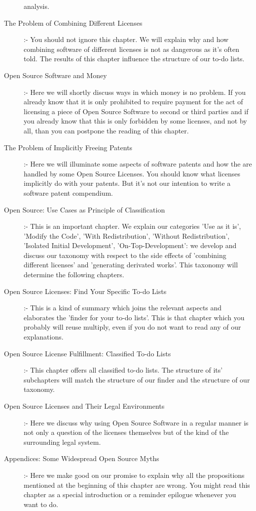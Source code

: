 \begin{description}
  analysis.
  \item[The Problem of Combining Different Licenses] :- You should
  not ignore this chapter. We will explain why and how combining software
  of different licenses is not as dangerous as it's often told. The results of
  this chapter influence the structure of our to-do lists.
  \item[Open Source Software and Money] :- Here we will shortly
  discuss ways in which money is no problem. If you already know that it is only
  prohibited to require payment for the act of licensing a piece of Open Source
  Software to second or third parties and if you already know that this is only
  forbidden by some licenses, and not by all, than you can postpone the reading
  of this chapter.
  \item[The Problem of Implicitly Freeing Patents] :- Here we
  will illuminate some aspects of software patents and how the are handled by
  some Open Source Licenses. You should know what licenses implicitly do with
  your patents. But it's not our intention to write a software patent
  compendium.
  \item[Open Source: Use Cases as Principle of Classification] :- This is an
  important chapter. We explain our categories 'Use as it is', 'Modify the
  Code', 'With Redistribution', 'Without Redistribution', 'Isolated Initial
  Development', 'On-Top-Development': we develop and discuss our taxonomy with
  respect to the side effects of 'combining different licenses' and 'generating
  derivated works'. This taxonomy will determine the following chapters.
  \item[Open Source Licenses: Find Your Specific To-do Lists] :- This is a kind
  of summary which joins the relevant aspects and elaborates the 'finder
  for your to-do lists'. This is that chapter which you probably will reuse
  multiply, even if you do not want to read any of our explanations.
  \item[Open Source License Fulfillment: Classified To-do Lists] :- This chapter
  offers all classified to-do lists. The structure of its' subchapters will
  match the structure of our finder and the structure of our taxonomy.
  \item[Open Source Licenses and Their Legal Environments] :- Here we discuss
  why using Open Source Software in a regular manner is not only a question of
  the licenses themselves but of the kind of the surrounding legal system.
  \item[Appendices: Some Widespread Open Source Myths] :- Here we make good on
  our promise to explain why all the propositions mentioned at the beginning of
  this chapter are wrong. You might read this chapter as a special introduction
  or a reminder epilogue whenever you want to do.
\end{description}


%
